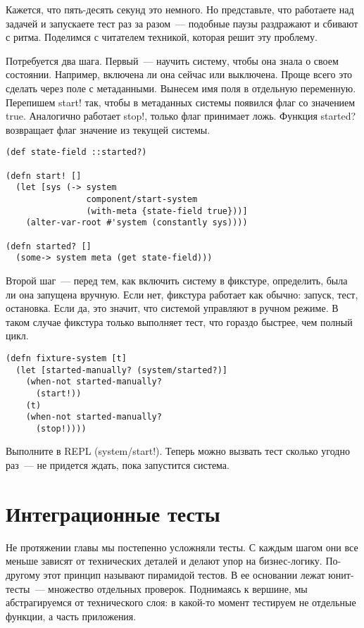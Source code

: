 Кажется, что пять-десять секунд это немного. Но представьте, что работаете над
задачей и запускаете тест раз за разом~--- подобные паузы раздражают и сбивают с
ритма. Поделимся с читателем техникой, которая решит эту проблему.

Потребуется два шага. Первый~--- научить систему, чтобы она знала о своем
состоянии. Например, включена ли она сейчас или выключена. Проще всего это
сделать через поле с метаданными. Вынесем имя поля в отдельную
переменную. Перепишем start! так, чтобы в метаданных системы появился флаг со
значением true. Аналогично работает stop!, только флаг принимает ложь. Функция
started? возвращает флаг значение из текущей системы.

\begin{verbatim}
(def state-field ::started?)

(defn start! []
  (let [sys (-> system
                component/start-system
                (with-meta {state-field true}))]
    (alter-var-root #'system (constantly sys))))

(defn started? []
  (some-> system meta (get state-field)))
\end{verbatim}

Второй шаг~--- перед тем, как включить систему в фикстуре, определить, была ли она
запущена вручную. Если нет, фикстура работает как обычно: запуск, тест,
остановка. Если да, это значит, что системой управляют в ручном режиме. В таком
случае фикстура только выполняет тест, что гораздо быстрее, чем полный цикл.

\begin{verbatim}
(defn fixture-system [t]
  (let [started-manually? (system/started?)]
    (when-not started-manually?
      (start!))
    (t)
    (when-not started-manually?
      (stop!))))
\end{verbatim}

Выполните в REPL (system/start!). Теперь можно вызвать тест сколько угодно раз~---
не придется ждать, пока запустится система.

\section{Интеграционные тесты}

Не протяжении главы мы постепенно усложняли тесты. С каждым шагом они все меньше
зависят от технических деталей и делают упор на бизнес-логику. По-другому этот
принцип называют пирамидой тестов. В ее основании лежат юнит-тесты~--- множество
отдельных проверок. Поднимаясь к вершине, мы абстрагируемся от технического
слоя: в какой-то момент тестируем не отдельные функции, а часть приложения.

